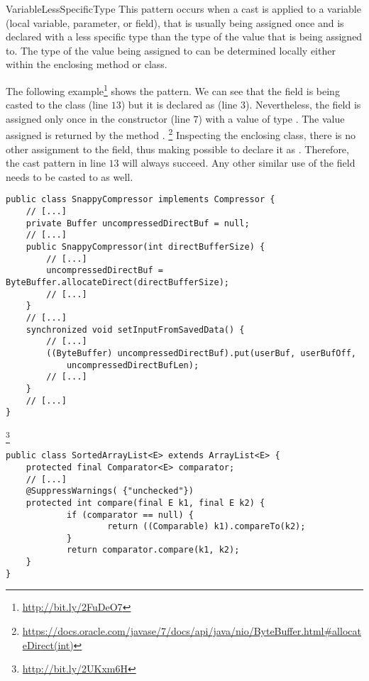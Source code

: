 \begin{pattern}{VariableLessSpecificType}
This pattern occurs when a cast is applied to a variable (local variable,
parameter, or field),
that is usually being assigned once and
is declared with a less specific type than the type of the value 
that is being assigned to.
The type of the value being assigned to can be determined locally
either within the enclosing method or class.

\instances{}
The following example\footnote{\url{http://bit.ly/2FuDeO7}} shows the \thisp{} pattern.
We can see that the field  is being casted to the  class (line $13$) but it is declared as  (line $3$).
Nevertheless, the field is assigned only once in the constructor (line $7$)
with a value of type .
The value assigned is returned by the method
.%
\footnote{\url{https://docs.oracle.com/javase/7/docs/api/java/nio/ByteBuffer.html\#allocateDirect(int)}}
Inspecting the enclosing class, there is no other assignment to the
 field,
thus making possible to declare it as .
Therefore, the cast pattern in line $13$ will always succeed.
Any other similar use of the  field needs to be casted to as well.

\begin{verbatim}
public class SnappyCompressor implements Compressor {
    // [...]
    private Buffer uncompressedDirectBuf = null;
    // [...]
    public SnappyCompressor(int directBufferSize) {
        // [...]
        uncompressedDirectBuf = ByteBuffer.allocateDirect(directBufferSize);
        // [...]
    }
    // [...]
    synchronized void setInputFromSavedData() {
        // [...]
        ((ByteBuffer) uncompressedDirectBuf).put(userBuf, userBufOff,
            uncompressedDirectBufLen);
        // [...]
    }
    // [...]
}
\end{verbatim}

\footnote{\url{http://bit.ly/2UKxm6H}}

\begin{verbatim}
public class SortedArrayList<E> extends ArrayList<E> {
    protected final Comparator<E> comparator;
    // [...]
    @SuppressWarnings( {"unchecked"})
    protected int compare(final E k1, final E k2) {
            if (comparator == null) {
                    return ((Comparable) k1).compareTo(k2);
            }
            return comparator.compare(k1, k2);
    }
}
\end{verbatim}


\end{pattern}
